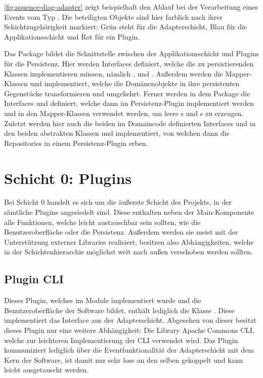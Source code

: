 \autoref{fig:squence-diag-adapter} zeigt beispielhaft den Ablauf bei der Verarbeitung eines Events vom Typ . Die beteiligten Objekte sind hier farblich nach ihrer Schichtzugehörigkeit markiert: Grün steht für die Adapterschicht, Blau für die Applikationsschicht und Rot für ein Plugin.

Das Package \href{https://github.com/anditru/quickie/tree/bb41442c7f1ffbfcd3117cd86a40f7932e543a33/1-quickie-adapters/src/main/java/org/pinkcrazyunicorn/quickie/adapters/persistence}{} bildet die Schnittstelle zwischen der Applikationsschicht und Plugins für die Persistenz. Hier werden Interfaces definiert, welche die zu persistierenden Klassen implementieren müssen, nämlich ,  und . Außerdem werden die Mapper-Klassen  und  implementiert, welche die Domänenobjekte in ihre persistenten Gegenstücke transformieren und umgekehrt. Ferner werden in dem Package die Interfaces  und  definiert, welche dann im Persistenz-Plugin implementiert werden und in den Mapper-Klassen verwendet werden, um leere s und s zu erzeugen. Zuletzt werden hier auch die beiden im Domaincode definierten Interfaces  und  in den beiden abstrakten Klassen  und  implementiert, von welchen dann die Repositories in einem Persistenz-Plugin erben.

\section{Schicht 0: Plugins}
Bei Schicht 0 handelt es sich um die äußerste Schicht des Projekts, in der sämtliche Plugins angesiedelt sind. Diese enthalten neben der Main-Komponente alle Funktionen, welche leicht austauschbar sein sollten, wie die Benutzeroberfläche oder die Persistenz. Außerdem werden sie meist mit der Unterstützung externer Libraries realisiert, besitzen also Abhängigkeiten, welche in der Schichtenhierarchie möglichst weit nach außen verschoben werden sollten.

\subsection{Plugin \acs{CLI}}
Dieses Plugin, welches im Module \href{https://github.com/anditru/quickie/tree/bb41442c7f1ffbfcd3117cd86a40f7932e543a33/0-quickie-plugin-cli}{} implementiert wurde und die Benutzeroberfläche der Software bildet, enthält lediglich die Klasse . Diese implementiert das Interface  aus der Adapterschicht. Abgesehen von dieser besitzt dieses Plugin nur eine weitere Abhängigkeit: Die Library Apache Commons CLI, welche zur leichteren Implementierung der \ac{CLI} verwendet wird. Das Plugin kommuniziert lediglich über die Eventfunktionalität der Adapterschicht mit dem Kern der Software, ist damit nur sehr lose an den selben gekoppelt und kann leicht ausgetauscht werden.

